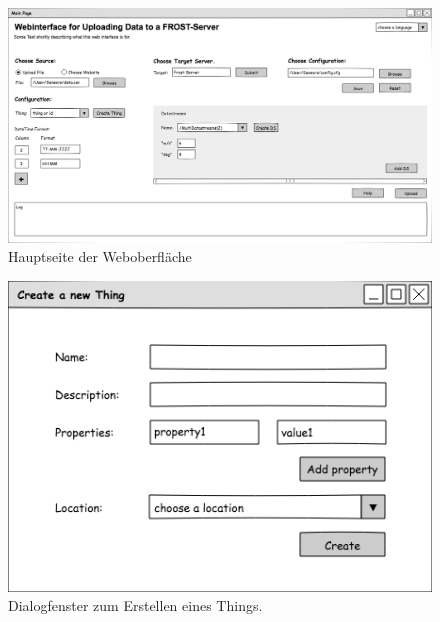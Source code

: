 \documentclass[12 pt]{article}
\begin{document}
	
	\begin{figure}[ht]
		\centering
		\includegraphics[scale=0.4, angle=90]{images/gui}
		\caption{\label{fig:guiMain}Hauptseite der Weboberfläche}
	\end{figure}
	
	\begin{figure}[ht]
		\centering
		\includegraphics[scale=1]{images/create_thing}
		\caption{\label{fig:thing}Dialogfenster zum Erstellen eines Things.}
	\end{figure}
	
\end{document}
